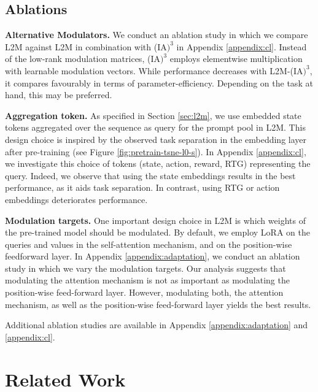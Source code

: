 \documentclass{article}
\begin{document}
\subsection{Ablations}\label{sec:exp-ablation}

\textbf{Alternative Modulators.}  
We conduct an ablation study in which we compare L2M against L2M in combination with (IA$\text{)}^3$ in Appendix \ref{appendix:cl}.
Instead of the low-rank modulation matrices, (IA$\text{)}^3$ employs elementwise multiplication with learnable modulation vectors. 
While performance decreases with L2M-(IA$\text{)}^3$, it compares favourably in terms of parameter-efficiency. Depending on the task at hand, this may be preferred. 

\textbf{Aggregation token.} 
As specified in Section \ref{sec:l2m}, we use embedded state tokens aggregated over the sequence as query for the prompt pool in L2M.
This design choice is inspired by the observed task separation in the embedding layer after pre-training (see Figure \ref{fig:pretrain-tsne-l0-s}). 
In Appendix \ref{appendix:cl}, we investigate this choice of tokens (state, action, reward, RTG) representing the query. 
Indeed, we observe that using the state embeddings results in the best performance, as it aids task separation. 
In contrast, using RTG or action embeddings deteriorates performance.

\textbf{Modulation targets.} 
One important design choice in L2M is which weights of the pre-trained model should be modulated. 
By default, we employ LoRA on the queries and values in the self-attention mechanism, and on the position-wise feedforward layer. 
In Appendix \ref{appendix:adaptation}, we conduct an ablation study in which we vary the modulation targets. 
Our analysis suggests that modulating the attention mechanism is not as important as modulating the position-wise feed-forward layer.
However, modulating both, the attention mechanism, as well as the position-wise feed-forward layer yields the best results.

Additional ablation studies are available in Appendix \ref{appendix:adaptation} and \ref{appendix:cl}.

\section{Related Work}\label{sec:relatedwork}
\end{document}
